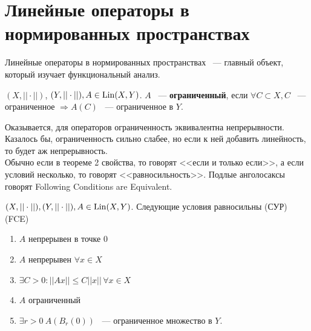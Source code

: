 \documentclass[document]{subfiles}
\begin{document}
\section{Линейные операторы в нормированных пространствах}
Линейные операторы в нормированных пространствах ~--- главный объект, который изучает функциональный анализ.
\begin{definition}
    $(X, || \cdot||)$, $(Y, || \cdot ||), A \in \operatorname{Lin}(X,Y) $. $A$ ~--- \textbf{ ограниченный}, если $\forall C \subset X, C$ ~--- ограниченное $\Rightarrow A(C)$ ~--- ограниченное 
    в $Y$.
\end{definition}
Оказывается, для операторов ограниченность эквивалентна непрерывности. Казалось бы, ограниченность сильно слабее, но если к ней добавить  линейность, то будет аж непрерывность. \\
Обычно если в теореме 2 свойства, то говорят <<если и только если>>, а если условий несколько, то говорят <<равносильность>>. Подлые анголосаксы говорят Following Conditions are Equivalent.
 
\begin{theorem}
    $(X, ||\cdot||), (Y, ||\cdot||), A \in \operatorname{Lin}(X,Y)$. Следующие условия равносильны (СУР) (FCE)
    \begin{enumerate}
        \item $A$ непрерывен в точке $0$ 
        \item $A$ непрерывен $\forall x \in X$  %
        \item $\exists C > 0 : ||Ax|| \leq C||x|| \, \forall x \in X $
        \item $A$ ограниченный
        \item $\exists r > 0 \: A(B_r(0))$ ~--- ограниченное множество в $Y$.
    \end{enumerate}
\end{theorem}
 
\end{document}
